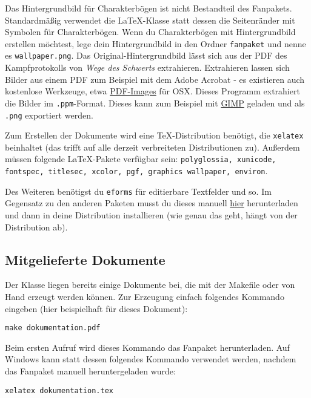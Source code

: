 \documentclass{dsa}
\begin{document}
   Das Hintergrundbild für Charakterbögen ist nicht Bestandteil des Fanpakets.
   Standardmäßig verwendet die \LaTeX-Klasse statt dessen die Seitenränder mit
   Symbolen für Charakterbögen. Wenn du Charakterbögen mit Hintergrundbild
   erstellen möchtest, lege dein Hintergrundbild in den Ordner \texttt{fanpaket}
   und nenne es \texttt{wallpaper.png}. Das Original-Hintergrundbild lässt sich
   aus der PDF des Kampfprotokolls von \textit{Wege des Schwerts} extrahieren.
   Extrahieren lassen sich Bilder aus einem PDF zum Beispiel mit dem Adobe
   Acrobat - es existieren auch kostenlose Werkzeuge, etwa
   \href{http://sourceforge.net/projects/pdf-images/}{PDF-Images} für OSX.
   Dieses Programm extrahiert die Bilder im \texttt{.ppm}-Format. Dieses kann
   zum Beispiel mit \href{http://www.gimp.org}{GIMP} geladen und als
   \texttt{.png} exportiert werden.
   
   Zum Erstellen der Dokumente wird eine TeX-Distribution benötigt, die
   \texttt{xelatex} beinhaltet (das trifft auf alle derzeit verbreiteten
   Distributionen zu). Außerdem müssen folgende LaTeX-Pakete verfügbar sein:
   \texttt{polyglossia, xunicode, fontspec, titlesec, xcolor, pgf, graphics
    wallpaper, environ}.
   
   Des Weiteren benötigst du \texttt{eforms} für editierbare Textfelder und so.
   Im Gegensatz zu den anderen Paketen musst du dieses manuell
   \href{http://www.ctan.org/pkg/eforms}{hier} herunterladen und dann in deine
   Distribution installieren (wie genau das geht, hängt von der Distribution ab).
   
   \subsection*{Mitgelieferte Dokumente}
   
   Der Klasse liegen bereits einige Dokumente bei, die mit der Makefile oder
   von Hand erzeugt werden können. Zur Erzeugung einfach folgendes Kommando
   eingeben (hier beispielhaft für dieses Dokument):
   
   \hspace{30pt}\texttt{make dokumentation.pdf}
   
   Beim ersten Aufruf wird dieses Kommando das Fanpaket herunterladen. Auf
   Windows kann statt dessen folgendes Kommando verwendet werden, nachdem
   das Fanpaket manuell heruntergeladen wurde:
   
   \hspace{30pt}\texttt{xelatex dokumentation.tex}
   
\end{document}
